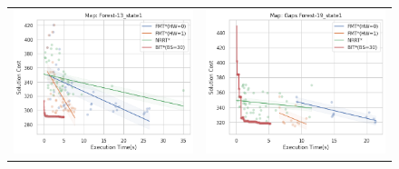\documentclass{article}
\begin{document}
\begin{figure}
{\begin{tabular}{cc}
			\includegraphics[scale=0.45]{scVet_Forest-13_state1.png} & \includegraphics[scale=0.45]{scVet_Gaps Forest-19_state1.png}    \\

\end{tabular}}
\end{figure}
\end{document}
